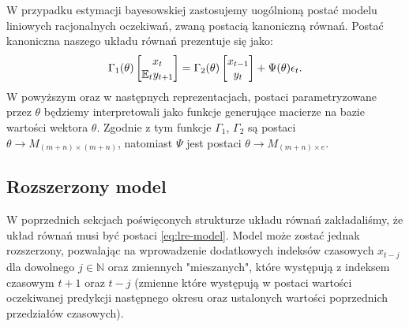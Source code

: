 W przypadku estymacji bayesowskiej zastosujemy uogólnioną postać modelu liniowych racjonalnych oczekiwań, zwaną postacią kanoniczną równań. Postać kanoniczna naszego układu równań prezentuje się jako:
\begin{equation}
    \label{eqn:canonic}
    \Gamma_1(\theta) \begin{bmatrix}
        x_{t} \\
        \mathbb{E}_t y_{t+1}
    \end{bmatrix} = \Gamma_2(\theta) \begin{bmatrix}
        x_{t-1} \\
        y_{t}
    \end{bmatrix} + \Psi(\theta) \epsilon_t.
\end{equation}
W powyższym oraz w następnych reprezentacjach, postaci parametryzowane przez $\theta$ będziemy interpretowali jako funkcje generujące macierze na bazie wartości wektora $\theta$. Zgodnie z tym funkcje $\Gamma_1$, $\Gamma_2$ są postaci $\theta \to M_{(m + n) \times (m + n)}$, natomiast $\Psi$ jest postaci $\theta \to M_{(m + n) \times e}$.

\subsection{Rozszerzony model}

W poprzednich sekcjach poświęconych strukturze układu równań zakładaliśmy, że układ równań musi być postaci \eqref{eq:lre-model}. Model może zostać jednak rozszerzony, pozwalając na wprowadzenie dodatkowych indeksów czasowych $x_{t - j}$ dla dowolnego $j \in \mathbb{N}$ oraz zmiennych "mieszanych", które występują z indeksem czasowym $t+1$ oraz $t-j$ (zmienne które występują w postaci wartości oczekiwanej predykcji następnego okresu oraz ustalonych wartości poprzednich przedziałów czasowych).


